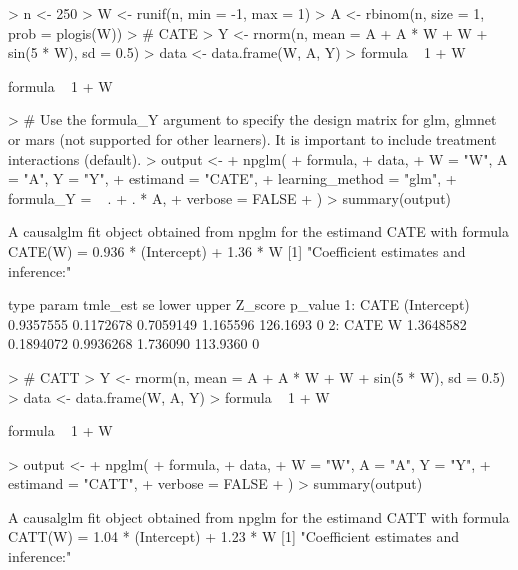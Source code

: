 \documentclass[article]{jss}
\begin{document}
\begin{Schunk}
\begin{Sinput}
> n <- 250
> W <- runif(n, min = -1, max = 1)
> A <- rbinom(n, size = 1, prob = plogis(W))
> # CATE
> Y <- rnorm(n, mean = A + A * W + W + sin(5 * W), sd = 0.5)
> data <- data.frame(W, A, Y)
> formula ~ 1 + W
\end{Sinput}
\begin{Soutput}
formula ~ 1 + W
\end{Soutput}
\begin{Sinput}
> # Use the formula_Y argument to specify the design matrix for glm, glmnet or mars (not supported for other learners). It is important to include treatment interactions (default).
> output <-
+   npglm(
+     formula,
+     data,
+     W = "W", A = "A", Y = "Y",
+     estimand = "CATE",
+     learning_method = "glm",
+     formula_Y = ~ . + . * A,
+     verbose = FALSE
+   )
> summary(output)
\end{Sinput}
\begin{Soutput}
A causalglm fit object obtained from npglm for the estimand CATE with formula 
CATE(W) = 0.936 * (Intercept) + 1.36 * W
[1] "Coefficient estimates and inference:"

   type       param  tmle_est        se     lower    upper  Z_score p_value
1: CATE (Intercept) 0.9357555 0.1172678 0.7059149 1.165596 126.1693       0
2: CATE           W 1.3648582 0.1894072 0.9936268 1.736090 113.9360       0
\end{Soutput}
\begin{Sinput}
> # CATT
> Y <- rnorm(n, mean = A + A * W + W + sin(5 * W), sd = 0.5)
> data <- data.frame(W, A, Y)
> formula ~ 1 + W
\end{Sinput}
\begin{Soutput}
formula ~ 1 + W
\end{Soutput}
\begin{Sinput}
> output <-
+   npglm(
+     formula,
+     data,
+     W = "W", A = "A", Y = "Y",
+     estimand = "CATT",
+     verbose = FALSE
+   )
> summary(output)
\end{Sinput}
\begin{Soutput}
A causalglm fit object obtained from npglm for the estimand CATT with formula 
CATT(W) = 1.04 * (Intercept) + 1.23 * W
[1] "Coefficient estimates and inference:"


\end{Soutput}
\end{Schunk}
\end{document}
